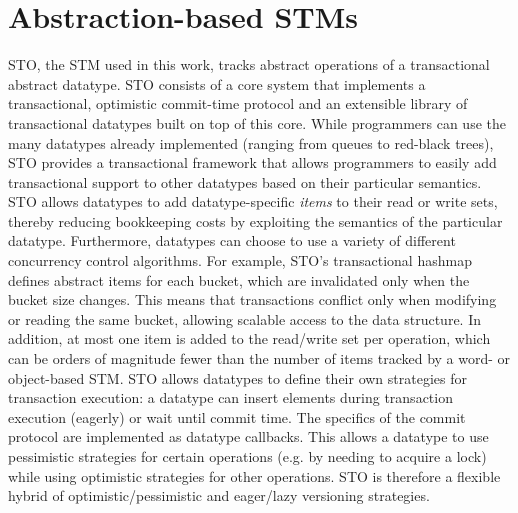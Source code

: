 \section{Abstraction-based STMs}

STO, the STM used in this work, tracks abstract operations of a transactional abstract datatype. STO consists of a core system that implements a transactional, optimistic commit-time protocol and an extensible library of transactional datatypes built on top of this core. While programmers can use the many datatypes already implemented (ranging from queues to red-black trees), STO provides a transactional framework that allows programmers to easily add transactional support to other datatypes based on their particular semantics. STO allows datatypes to add datatype-specific \emph{items} to their read or write sets, thereby reducing bookkeeping costs by 
exploiting the semantics of the particular datatype. Furthermore, datatypes can choose to use a variety of different concurrency control algorithms. For example, STO's transactional hashmap defines abstract items for each bucket, which are invalidated only when the bucket size changes. This means that transactions conflict only when modifying or reading the same bucket, allowing scalable access to the data structure. In addition, at most one item is added to the read/write set per operation, which can be orders of magnitude fewer than the number of items tracked by a word- or object-based STM. STO allows datatypes to define their own strategies for transaction execution: a datatype can insert elements during transaction execution (eagerly) or wait until commit time. The specifics of the commit protocol are implemented as datatype callbacks. This allows a datatype to use pessimistic strategies for certain operations (e.g. by needing to acquire a lock) while using optimistic strategies for other operations. STO is therefore a flexible hybrid of optimistic/pessimistic and eager/lazy versioning strategies.

